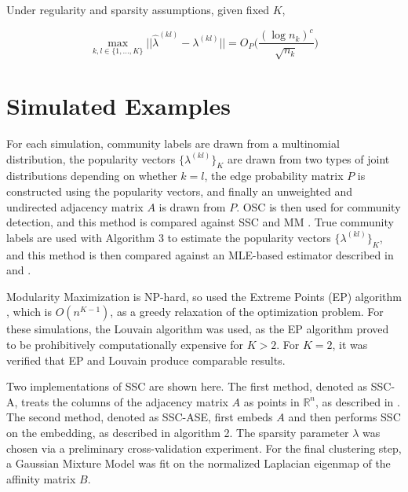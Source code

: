 \documentclass[
  12pt,
]{article}
\begin{document}
\begin{theorem}
\label{theorem6}
Under regularity and sparsity assumptions, given fixed $K$, 

\begin{equation} \label{eq:thm6}
\max_{k, l \in \{1, ..., K\}} 
||\hat{\lambda}^{(kl)} - \lambda^{(kl)}|| = 
O_P \bigg(\frac{(\log n_k)^c}{\sqrt{n_k}} \bigg)
\end{equation}
\end{theorem}

\hypertarget{simulated-examples}{%
\section{Simulated Examples}\label{simulated-examples}}

For each simulation, community labels are drawn from a multinomial
distribution, the popularity vectors \(\{\lambda^{(kl)}\}_K\) are drawn
from two types of joint distributions depending on whether \(k = l\),
the edge probability matrix \(P\) is constructed using the popularity
vectors, and finally an unweighted and undirected adjacency matrix \(A\)
is drawn from \(P\). OSC is then used for community detection, and this
method is compared against SSC \cite{noroozi2019estimation}
\cite{soltanolkotabi2014} and MM \cite{igraph}
\cite{307cbeb9b1be48299388437423d94bf1}. True community labels are used
with Algorithm 3 to estimate the popularity vectors
\(\{\lambda^{(kl)}\}_K\), and this method is then compared against an
MLE-based estimator described in \citeauthor{noroozi2019estimation} and
\citeauthor{307cbeb9b1be48299388437423d94bf1}.

Modularity Maximization is NP-hard, so
\citeauthor{307cbeb9b1be48299388437423d94bf1} used the Extreme Points
(EP) algorithm \cite{le2016}, which is \(O(n^{K - 1})\), as a greedy
relaxation of the optimization problem. For these simulations, the
Louvain algorithm was used, as the EP algorithm proved to be
prohibitively computationally expensive for \(K > 2\). For \(K = 2\), it
was verified that EP and Louvain produce comparable results.

Two implementations of SSC are shown here. The first method, denoted as
SSC-A, treats the columns of the adjacency matrix \(A\) as points in
\(\mathbb{R}^n\), as described in \citeauthor{noroozi2019estimation}.
The second method, denoted as SSC-ASE, first embeds \(A\) and then
performs SSC on the embedding, as described in algorithm 2. The sparsity
parameter \(\lambda\) was chosen via a preliminary cross-validation
experiment. For the final clustering step, a Gaussian Mixture Model was
fit on the normalized Laplacian eigenmap of the affinity matrix \(B\).
\end{document}
